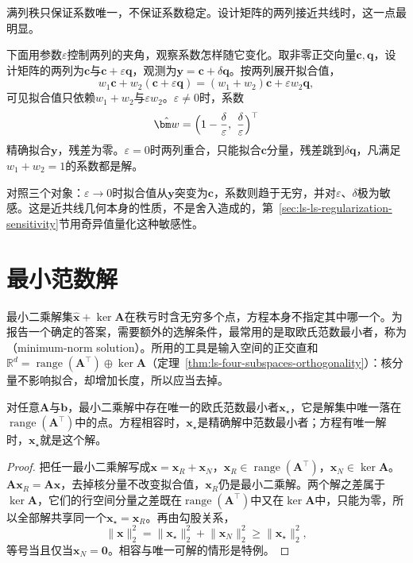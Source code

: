 满列秩只保证系数唯一，不保证系数稳定。设计矩阵的两列接近共线时，这一点最明显。

\begin{example}[近共线设计]
\label{ex:ls-nearly-collinear-design}
下面用参数$\varepsilon$控制两列的夹角，观察系数怎样随它变化。取非零正交向量$\bm c,\bm q$，设计矩阵的两列为$\bm c$与$\bm c+\varepsilon\bm q$，观测为$\bm y=\bm c+\delta\bm q$。按两列展开拟合值，
\[
 w_1\bm c+w_2(\bm c+\varepsilon\bm q)=(w_1+w_2)\bm c+\varepsilon w_2\bm q ,
\]
可见拟合值只依赖$w_1+w_2$与$\varepsilon w_2$。$\varepsilon\neq0$时，系数
\[
 \hat{\bm w}=\Bigl(1-\frac{\delta}{\varepsilon},\ \frac{\delta}{\varepsilon}\Bigr)^\top
\]
精确拟合$\bm y$，残差为零。$\varepsilon=0$时两列重合，只能拟合$\bm c$分量，残差跳到$\delta\bm q$，凡满足$w_1+w_2=1$的系数都是解。
\end{example}

对照三个对象：$\varepsilon\to0$时拟合值从$\bm y$突变为$\bm c$，系数则趋于无穷，并对$\varepsilon$、$\delta$极为敏感。这是近共线几何本身的性质，不是舍入造成的，第~\ref{sec:ls-ls-regularization-sensitivity}节用奇异值量化这种敏感性。

\section{最小范数解}
\label{sec:ls-select-among-solutions}

最小二乘解集$\hat{\bm x}+\ker\bm A$在秩亏时含无穷多个点，方程本身不指定其中哪一个。为报告一个确定的答案，需要额外的选解条件，最常用的是取欧氏范数最小者，称为（minimum-norm solution）。所用的工具是输入空间的正交直和$\mathbb R^d=\operatorname{range}(\bm A^\top)\oplus\ker\bm A$（定理~\ref{thm:ls-four-subspaces-orthogonality}）：核分量不影响拟合，却增加长度，所以应当去掉。

\begin{theorem}[最小范数代表]
\label{thm:ls-minimum-norm-representative}
对任意$\bm A$与$\bm b$，最小二乘解中存在唯一的欧氏范数最小者$\bm x_\star$，它是解集中唯一落在$\operatorname{range}(\bm A^\top)$中的点。方程相容时，$\bm x_\star$是精确解中范数最小者；方程有唯一解时，$\bm x_\star$就是这个解。
\end{theorem}
\begin{proof}
把任一最小二乘解写成$\bm x=\bm x_R+\bm x_N$，$\bm x_R\in\operatorname{range}(\bm A^\top)$，$\bm x_N\in\ker\bm A$。$\bm A\bm x_R=\bm A\bm x$，去掉核分量不改变拟合值，$\bm x_R$仍是最小二乘解。两个解之差属于$\ker\bm A$，它们的行空间分量之差既在$\operatorname{range}(\bm A^\top)$中又在$\ker\bm A$中，只能为零，所以全部解共享同一个$\bm x_\star=\bm x_R$。再由勾股关系，
\[
 \lVert\bm x\rVert_2^2=\lVert\bm x_\star\rVert_2^2+\lVert\bm x_N\rVert_2^2\geq\lVert\bm x_\star\rVert_2^2 ,
\]
等号当且仅当$\bm x_N=\bm0$。相容与唯一可解的情形是特例。
\end{proof}


